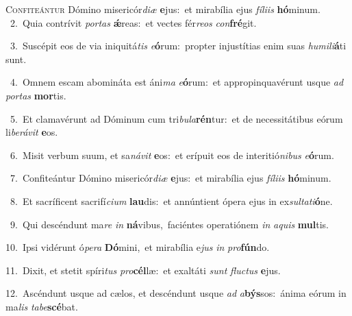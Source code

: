 \lettrine{\initial\textcolor{\initialcolor}{C}}{onfiteántur} Dómino misericór\-\textit{di}\-\textit{æ} \textbf{e}\-jus:~\star et mirabília ejus \textit{fí}\-\textit{li}\textit{is} \textbf{hó}\-minum.\\
{\numbfont\textcolor{\numbcolor}{~2.}}~Quia contrívit \textit{por}\-\textit{tas} \textbf{ǽ}\-reas:~\star et vectes fér\-\textit{re}\-\textit{os} \textit{con}\-\textbf{fré}git.\par
{\numbfont\textcolor{\numbcolor}{~3.}}~Suscépit eos de via iniquitá\textit{tis} \textit{e}\-\textbf{ó}rum:~\star propter injustítias enim suas \textit{hu}\-\textit{mi}\textit{li}\textbf{á}ti sunt.\par
{\numbfont\textcolor{\numbcolor}{~4.}}~Omnem escam abomináta est áni\textit{ma} \textit{e}\-\textbf{ó}rum:~\star et appropinquavérunt usque \textit{ad} \textit{por}\-\textit{tas} \textbf{mor}\-tis.\par
{\numbfont\textcolor{\numbcolor}{~5.}}~Et clamavérunt ad Dóminum cum tri\-\textit{bu}\-\textit{la}\textbf{rén}tur:~\star et de necessitátibus eórum li\-\textit{be}\-\textit{rá}\textit{vit} \textbf{e}\-os.\par
{\numbfont\textcolor{\numbcolor}{~6.}}~Misit verbum suum, et sa\-\textit{ná}\-\textit{vit} \textbf{e}\-os:~\star et erípuit eos de interitió\-\textit{ni}\-\textit{bus} \textit{e}\-\textbf{ó}rum.\par
{\numbfont\textcolor{\numbcolor}{~7.}}~Confiteántur Dómino misericór\-\textit{di}\-\textit{æ} \textbf{e}\-jus:~\star et mirabília ejus \textit{fí}\-\textit{li}\textit{is} \textbf{hó}\-minum.\par
{\numbfont\textcolor{\numbcolor}{~8.}}~Et sacríficent sacrifí\-\textit{ci}\-\textit{um} \textbf{lau}\-dis:~\star et annúntient ópera ejus in ex\-\textit{sul}\-\textit{ta}\textit{ti}\textbf{ó}ne.\par
{\numbfont\textcolor{\numbcolor}{~9.}}~Qui descéndunt ma\textit{re} \textit{in} \textbf{ná}\-vibus,~\star faciéntes operatiónem \textit{in} \textit{a}\-\textit{quis} \textbf{mul}\-tis.\par
{\numbfont\textcolor{\numbcolor}{10.}}~Ipsi vidérunt ó\-\textit{pe}\-\textit{ra} \textbf{Dó}\-mini,~\star et mirabília e\textit{jus} \textit{in} \textit{pro}\-\textbf{fún}do.\par
{\numbfont\textcolor{\numbcolor}{11.}}~Dixit, et stetit spíri\textit{tus} \textit{pro}\-\textbf{cél}læ:~\star et exaltáti \textit{sunt} \textit{fluc}\-\textit{tus} \textbf{e}\-jus.\par
{\numbfont\textcolor{\numbcolor}{12.}}~Ascéndunt usque ad cælos, et descéndunt usque \textit{ad} \textit{a}\-\textbf{býs}sos:~\star ánima eórum in ma\textit{lis} \textit{ta}\-\textit{be}\textbf{scé}bat.\par
